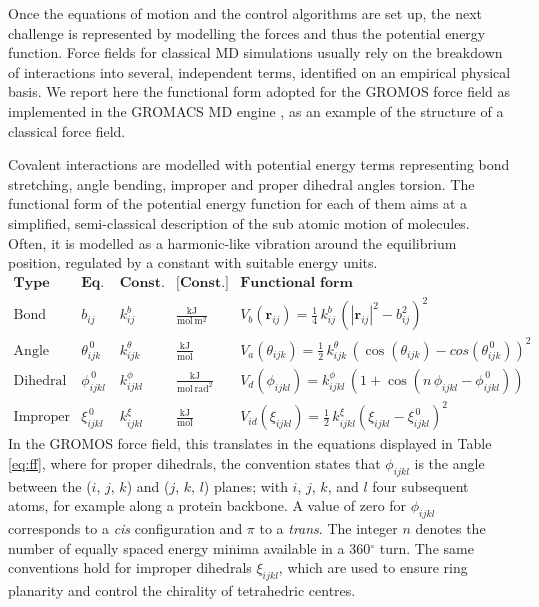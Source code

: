 \documentclass[graybox]{svmult}
\begin{document}
Once the equations of motion and the control algorithms are set up, the next challenge is represented by modelling the forces and thus the potential energy function.
%
Force fields for classical MD simulations usually rely on the breakdown of interactions into several, independent terms, identified on an empirical physical basis. We report here the functional form adopted for the GROMOS force field \cite{Oostenbrink2004,Schmid2011} as implemented in the GROMACS MD engine \cite{Berendsen1995,Abraham2015,gromacs_man}, as an example of the structure of a classical force field.

 Covalent interactions are modelled with potential energy terms representing bond stretching, angle bending, improper and proper dihedral angles torsion. 
%
The functional form of the potential energy function for each of them aims at a simplified, semi-classical description of the sub atomic motion of molecules. Often, it is modelled as a harmonic-like vibration around the equilibrium position, regulated by a constant with suitable energy units.
%
\begin{equation} \label{eq:ff}
\begin{array}{lcccl}
\textbf{Type} & \textbf{Eq. pos.} & \textbf{Const.} & \textbf{[Const.]} & \textbf{Functional form} \\
\hline 
  \text{Bond} & b_{ij} & k^b_{ij} & \frac{\text{kJ}}{\text{mol}\,\text{m}^2} & V_b(\textbf{r}_{ij}) = \frac{1}{4}\,k^b_{ij}\,\left(|\textbf{r}_{ij}|^2 - b_{ij}^2\right)^2 \\ 
  \text{Angle} & \theta^{\, 0}_{ijk} & k^\theta_{ijk} & \frac{\text{kJ}}{\text{mol}}  & V_a(\theta_{ijk}) = \frac{1}{2}\,k^\theta_{ijk}\,\left(\cos\left(\theta_{ijk}\right) - cos\left(\theta^{\, 0}_{ijk}\right)\right)^2 \\
  \text{Dihedral} & \phi_{ijkl}^{\, 0} & k_{ijkl}^\phi & \frac{\text{kJ}}{\text{mol}\,\text{rad}^2}  & V_d(\phi_{ijkl}) = k_{ijkl}^\phi\,\left( 1 + \cos\left( n \, \phi_{ijkl} - \phi_{ijkl}^{\, 0} \right) \right) \\
  \text{Improper} & \xi_{ijkl}^{\, 0} & k_{ijkl}^\xi & \frac{\text{kJ}}{\text{mol}}  & V_{id} (\xi_{ijkl}) = \frac{1}{2}\,k_{ijkl}^\xi \left( \xi_{ijkl} - \xi_{ijkl}^{\, 0} \right)^2
 \end{array}
\end{equation}
In the GROMOS force field, this translates in the equations displayed in Table \ref{eq:ff}, where for proper dihedrals, the convention states that $\phi_{ijkl}$ is the angle between the ($i$, $j$, $k$) and ($j$, $k$, $l$) planes; with $i$, $j$, $k$, and $l$ four subsequent atoms, for example along a protein backbone. A value of zero for $\phi_{ijkl}$ corresponds to a \textit{cis} configuration and $\pi$ to a \emph{trans}. The integer $n$ denotes the number of equally spaced energy minima available in a 360$^\circ$ turn.
%
The same conventions hold for improper dihedrals $\xi_{ijkl}$, which are used to ensure ring planarity and control the chirality of tetrahedric centres.
\end{document}
